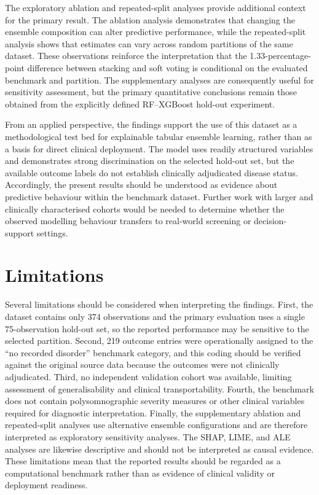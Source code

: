 \documentclass[a4paper,fleqn]{cas-dc}
\begin{document}
The exploratory ablation and repeated-split analyses provide additional context for the primary result. The ablation analysis demonstrates that changing the ensemble composition can alter predictive performance, while the repeated-split analysis shows that estimates can vary across random partitions of the same dataset. These observations reinforce the interpretation that the 1.33-percentage-point difference between stacking and soft voting is conditional on the evaluated benchmark and partition. The supplementary analyses are consequently useful for sensitivity assessment, but the primary quantitative conclusions remain those obtained from the explicitly defined RF--XGBoost hold-out experiment.

From an applied perspective, the findings support the use of this dataset as a methodological test bed for explainable tabular ensemble learning, rather than as a basis for direct clinical deployment. The model uses readily structured variables and demonstrates strong discrimination on the selected hold-out set, but the available outcome labels do not establish clinically adjudicated disease status. Accordingly, the present results should be understood as evidence about predictive behaviour within the benchmark dataset. Further work with larger and clinically characterised cohorts would be needed to determine whether the observed modelling behaviour transfers to real-world screening or decision-support settings.


\section{Limitations}
\label{sec:limitations}

Several limitations should be considered when interpreting the findings. First, the dataset contains only 374 observations and the primary evaluation uses a single 75-observation hold-out set, so the reported performance may be sensitive to the selected partition. Second, 219 outcome entries were operationally assigned to the ``no recorded disorder'' benchmark category, and this coding should be verified against the original source data because the outcomes were not clinically adjudicated. Third, no independent validation cohort was available, limiting assessment of generalisability and clinical transportability. Fourth, the benchmark does not contain polysomnographic severity measures or other clinical variables required for diagnostic interpretation. Finally, the supplementary ablation and repeated-split analyses use alternative ensemble configurations and are therefore interpreted as exploratory sensitivity analyses. The SHAP, LIME, and ALE analyses are likewise descriptive and should not be interpreted as causal evidence. These limitations mean that the reported results should be regarded as a computational benchmark rather than as evidence of clinical validity or deployment readiness.
\end{document}
